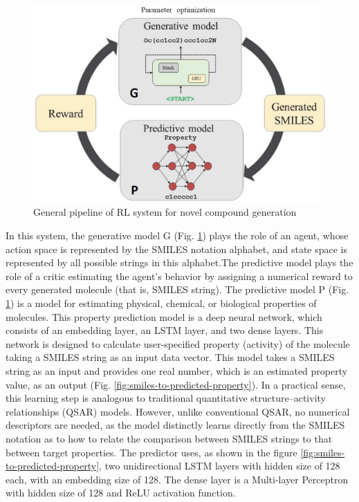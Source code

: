 \documentclass[a4paper]{article}
\begin{document}
\begin{figure}[htbp]
		\centering
			\includegraphics[width=\textwidth]{parameter-optimization.png}
		\caption{General pipeline of RL system for novel compound generation}
		\label{fig:parameter-optimization}
	\end{figure}

In this system, the generative model G (Fig. \ref{fig:parameter-optimization}) plays the role of an agent, whose action space is represented by the SMILES notation alphabet, and state space is represented by all possible strings in this alphabet.The predictive model plays the role of a critic estimating the agent’s behavior by assigning a numerical reward to every generated molecule (that is, SMILES string). 
The predictive model P (Fig. \ref{fig:parameter-optimization}) is a model for estimating physical, chemical, or biological properties of molecules. This property prediction model is a deep neural network, which consists of an embedding layer, an LSTM layer, and two dense layers. This network is designed to calculate user-specified property (activity) of the molecule taking a SMILES string as an input data vector. This model takes a SMILES string as an input and provides one real number, which is an estimated property value, as an output (Fig. \ref{fig:smiles-to-predicted-property}). In a practical sense, this learning step is analogous to traditional  quantitative structure–activity relationships (QSAR) models. However, unlike conventional QSAR, no numerical descriptors are needed, as the model distinctly learns directly from the SMILES notation as to how to relate the comparison between SMILES strings to that between target properties. The predictor uses, as shown in the figure \ref{fig:smiles-to-predicted-property}, two unidirectional LSTM layers with hidden size of 128 each, with an embedding size of 128. The dense layer is a Multi-layer Perceptron with hidden size of 128 and ReLU activation function.
\end{document}
